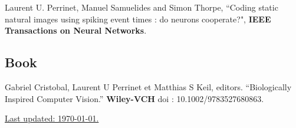 \documentclass[11pt, a4paper]{article}
\newcommand{\doi}[1]{\href{#1}{\scriptsize\textsc{[doi]}}}
\newcommand{\years}[1]{\marginnote{\scriptsize #1}}
\providecommand{\doi}[1]{doi: #1}\else
\providecommand{\doi}{doi: \begingroup \urlstyle{rm}\Url}\fi
\begin{document}
\noindent\years{2004}Laurent U. Perrinet, Manuel Samuelides and Simon Thorpe, ``Coding static natural images using spiking event times : do neurons cooperate?",  {\bf IEEE Transactions on Neural Networks}.\\%

\subsection*{Book}

\noindent\years{2015}Gabriel Cristobal, Laurent U Perrinet et Matthias S Keil, editors. ``Biologically Inspired Computer Vision.'' {\bf Wiley-VCH} %
doi : 10.1002/9783527680863. %
%
%

\vfill{}
\hrulefill

\begin{center}

{\footnotesize \href{https://github.com/laurentperrinet/perrinet_curriculum-vitae.tex}{Last updated: \today .}
}
\end{center}
\end{document}
